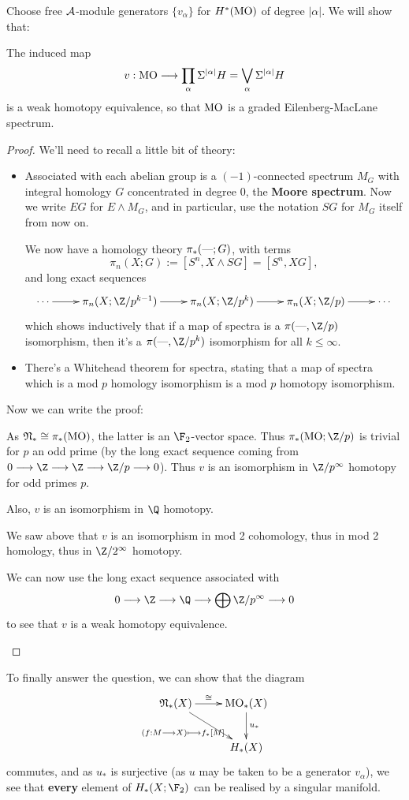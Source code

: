 \documentclass[11pt]{article}
\renewcommand{\Steen}{\calA}
\begin{document}
Choose free $\Steen$-module generators $\{v_\alpha\}$ for $H^*(\operatorname{{MO}})$ of degree $|\alpha|$. We will show that:
\begin{thm*}
The induced map
\[v:\operatorname{{MO}}\longrightarrow \prod_{\alpha}\Sigma^{|\alpha|}H=\bigvee_{\alpha}\Sigma^{|\alpha|}H\]
is a weak homotopy equivalence, so that $\operatorname{{MO}}$ is a graded Eilenberg-MacLane spectrum.
\end{thm*}
\begin{proof}
We'll need to recall a little bit of theory:
\begin{itemize}\squishlist
\item Associated with each abelian group is a $(-1)$-connected spectrum $M_G$ with integral homology $G$ concentrated in degree 0, the \textbf{Moore spectrum}. Now we write $EG$ for $E\wedge M_G$, and in particular, use the notation $SG$ for $M_G$ itself from now on.

We now have a homology theory $\pi_{*}(\textup{---} ;G)$, with terms
\[\pi_{n}(X;G):=[S^n,X\wedge SG]=[S^n,XG],\]
and long exact sequences
\[\xymatrix{\cdots\ar[r]&
\pi_n(X;\Z/p^{k-1})\ar[r]&
\pi_n(X;\Z/p^{k})\ar[r]&
\pi_n(X;\Z/p)\ar[r]&
\cdots}\]
which shows inductively that if a map of spectra is a $\pi(\DASH ,\Z/p)$ isomorphism, then it's a $\pi(\DASH ,\Z/p^k)$ isomorphism for all $k\leq\infty$.
\item There's a Whitehead theorem for spectra, stating that a map of spectra which is a mod $p$ homology isomorphism is a mod $p$ homotopy isomorphism.
\end{itemize}
Now we can write the proof:
\begin{itemise}
\item As $\mathfrak{N}_*\cong\pi_{*}(\operatorname{{MO}})$, the latter is an $\F_2$-vector space. Thus $\pi_{*}(\MO;\Z/p)$ is trivial for $p$ an odd prime (by the long exact sequence coming from $0\to \Z\to \Z\to \Z/p\to 0$). Thus $v$ is an isomorphism in $\Z/p^\infty$ homotopy for odd primes $p$.
\item Also, $v$ is an isomorphism in $\Q$ homotopy.
\item We saw above that $v$ is an isomorphism in mod 2 cohomology, thus in mod 2 homology, thus in $\Z/2^\infty$ homotopy.
\item We can now use the long exact sequence associated with
\[0\to\Z\to \Q\to \bigoplus\Z/p^\infty\to0\]
to see that $v$ is a weak homotopy equivalence.\qedhere
\end{itemise}

\end{proof}
To finally answer the question, we can show that the diagram
\[\xymatrix{
\frakN_*(X)
\ar[r]^-{\cong }
\ar[dr]_-{(f:M\to X)\mapsto f_*[M]}
&%
\MO_*(X)
\ar[d]^-{u_*}
\\%
&%
H_*(X)%
}\]
commutes, and as $u_*$ is surjective (as $u$ may be taken to be a generator $v_\alpha$), we see that \textbf{every} element of $H_*(X;\F_2)$ can be realised by a singular manifold.
\end{document}
